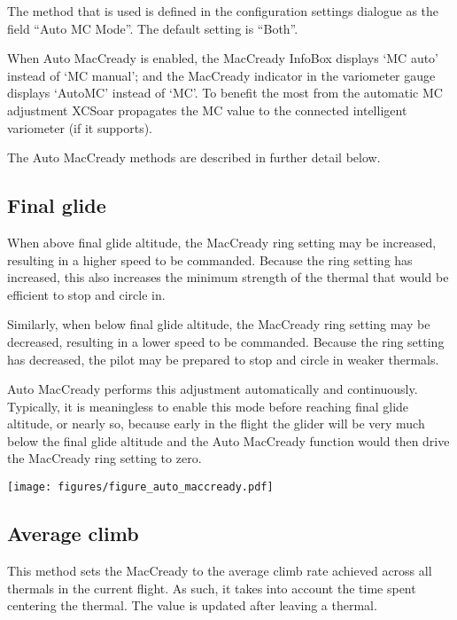 The method that is used is defined in the configuration settings dialogue as the
field ``Auto MC Mode''.  The default setting is ``Both''.

When Auto MacCready is enabled, the MacCready InfoBox displays `MC auto'
instead of `MC manual'; and the MacCready indicator in the variometer
gauge displays `AutoMC' instead of `MC'.
To benefit the most from the automatic MC adjustment XCSoar propagates the MC
value to the connected intelligent variometer (if it supports).

The Auto MacCready methods are described in further detail below.


\subsection*{Final glide}

When above final glide altitude, the MacCready ring setting may be
increased, resulting in a higher speed to be commanded.  Because the
ring setting has increased, this also increases the minimum strength
of the thermal that would be efficient to stop and circle in.

Similarly, when below final glide altitude, the MacCready ring setting
may be decreased, resulting in a lower speed to be commanded.  Because
the ring setting has decreased, the pilot may be prepared to stop and
circle in weaker thermals.

Auto MacCready performs this adjustment automatically and
continuously.  Typically, it is meaningless to enable this mode before
reaching final glide altitude, or nearly so, because early in the
flight the glider will be very much below the final glide altitude and
the Auto MacCready function would then drive the MacCready ring
setting to zero.

\begin{maxipage}
\begin{center}
\texttt{[image: figures/figure\_auto\_maccready.pdf]}
\end{center}
\end{maxipage}


\subsection*{Average climb}

This method sets the MacCready to the average climb rate achieved
across all thermals in the current flight.  As such, it takes into
account the time spent centering the thermal.  The value is updated
after leaving a thermal.

